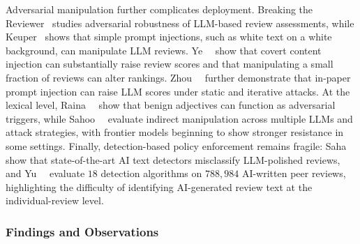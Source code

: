 Adversarial manipulation further complicates deployment. Breaking the Reviewer~\cite{breakingreviewer2025} studies adversarial robustness of LLM-based review assessments, while Keuper~\cite{promptinjectionreview2025} shows that simple prompt injections, such as white text on a white background, can manipulate LLM reviews. Ye~\etal~\cite{ye2024peerrisks} show that covert content injection can substantially raise review scores and that manipulating a small fraction of reviews can alter rankings. Zhou~\etal~\cite{zhou2025positiveprompt} further demonstrate that in-paper prompt injection can raise LLM scores under static and iterative attacks. At the lexical level, Raina~\etal~\cite{raina2024adversarialjudge} show that benign adjectives can function as adversarial triggers, while Sahoo~\etal~\cite{sahoo2025indirect} evaluate indirect manipulation across multiple LLMs and attack strategies, with frontier models beginning to show stronger resistance in some settings. Finally, detection-based policy enforcement remains fragile: Saha~\etal~\cite{reviewpolicyenforce2026} show that state-of-the-art AI text detectors misclassify LLM-polished reviews, and Yu~\etal~\cite{aidetectionreview2025} evaluate $18$ detection algorithms on $788{,}984$ AI-written peer reviews, highlighting the difficulty of identifying AI-generated review text at the individual-review level.






\subsubsection{Findings and Observations}
\label{sec:s6_findings}

